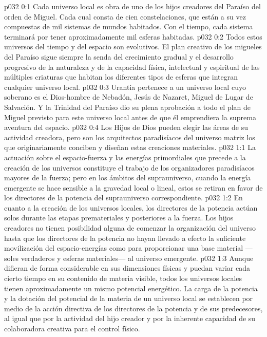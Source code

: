 \author{Mensajero poderoso}
\vs p032 0:1 Cada universo local es obra de uno de los hijos creadores del Paraíso del orden de Miguel. Cada cual consta de cien constelaciones, que están a su vez compuestas de mil sistemas de mundos habitados. Con el tiempo, cada sistema terminará por tener aproximadamente mil esferas habitadas.
\vs p032 0:2 Todos estos universos del tiempo y del espacio son evolutivos. El plan creativo de los migueles del Paraíso sigue siempre la senda del crecimiento gradual y el desarrollo progresivo de la naturaleza y de la capacidad física, intelectual y espiritual de las múltiples criaturas que habitan los diferentes tipos de esferas que integran cualquier universo local.
\vs p032 0:3 Urantia pertenece a un universo local cuyo soberano es el Dios\hyp{}hombre de Nebadón, Jesús de Nazaret, Miguel de Lugar de Salvación. Y la Trinidad del Paraíso dio su plena aprobación a todo el plan de Miguel previsto para este universo local antes de que él emprendiera la suprema aventura del espacio.
\vs p032 0:4 Los Hijos de Dios pueden elegir las áreas de su actividad creadora, pero son los arquitectos paradisíacos del universo matriz los que originariamente conciben y diseñan estas creaciones materiales.
\vs p032 1:1 La actuación sobre el espacio\hyp{}fuerza y las energías primordiales que precede a la creación de los universos constituye el trabajo de los organizadores paradisíacos mayores de la fuerza; pero en los ámbitos del suprauniverso, cuando la energía emergente se hace sensible a la gravedad local o lineal, estos se retiran en favor de los directores de la potencia del suprauniverso correspondiente.
\vs p032 1:2 En cuanto a la creación de los universos locales, los directores de la potencia actúan solos durante las etapas premateriales y posteriores a la fuerza. Los hijos creadores no tienen posibilidad alguna de comenzar la organización del universo hasta que los directores de la potencia no hayan llevado a efecto la suficiente movilización del espacio\hyp{}energías como para proporcionar una base material ---soles verdaderos y esferas materiales--- al universo emergente.
\vs p032 1:3 \pc Aunque difieran de forma considerable en sus dimensiones físicas y puedan variar cada cierto tiempo en su contenido de materia visible, todos los universos locales tienen aproximadamente un mismo potencial energético. La carga de la potencia y la dotación del potencial de la materia de un universo local se establecen por medio de la acción directiva de los directores de la potencia y de sus predecesores, al igual que por la actividad del hijo creador y por la inherente capacidad de su colaboradora creativa para el control físico.
